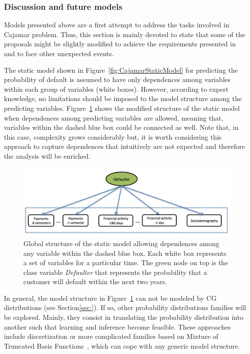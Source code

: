 \subsubsection{Discussion and future models}\label{subsubsec:discussion}

Models presented above are a first attempt to address the tasks involved in Cajamar problem. Thus, this section is mainly devoted to state that some of the proposals might be slightly modified to achieve the requirements presented in~\cite{Fer14b} and to face other unexpected events.

The static model shown in Figure~\ref{fig:CajamarStaticModel} for predicting the probability of default is assumed to have only dependences among variables within each group of variables (white boxes). However, according to expert knowledge, no limitations should be imposed to the model structure among the predicting variables. Figure~\ref{fig:staticDependences} shows the modified structure of the static model when dependences among predicting variables are allowed, meaning that, variables within the dashed blue box could be connected as well. Note that, in this case, complexity grows considerably but, it is worth considering this approach to capture dependences that intuitively are not expected and therefore the analysis will be enriched.

\begin{figure}[htbp]
  \centering
\includegraphics[scale=0.35]{./figures/CajaMarModel3}
\caption{\label{fig:staticDependences}Global structure of the static model allowing dependences among any variable within the dashed blue box. Each white box represents a set of variables for a particular time. The green node on top is the class variable \emph{Defaulter} that represents the probability that a customer will default within the next two years.} 
\end{figure}


In general, the model structure in Figure~\ref{fig:staticDependences} can not be modeled by CG distributions (see Section\ref{sec:}). If so, other probability distributions families will be explored. Mainly, they consist in translating the probability distribution into another such that learning and inference become feasible. These approaches include discretization or more complicated families based on Mixture of Truncated Basis Functions~\cite{Lan12}, which can cope with any generic model structure.


